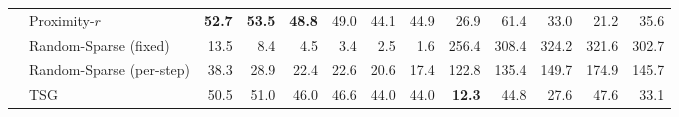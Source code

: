 \begin{table}[!ht]
\begin{tabular}{llrrrrrrrrrrr}
 & Proximity-$r$ & \textbf{52.7} & \textbf{53.5} & \textbf{48.8} & 49.0 & 44.1 & 44.9 & 26.9 & 61.4 & 33.0 & 21.2 & 35.6 \\
 & Random-Sparse (fixed) & 13.5 & 8.4 & 4.5 & 3.4 & 2.5 & 1.6 & 256.4 & 308.4 & 324.2 & 321.6 & 302.7 \\
 & Random-Sparse (per-step) & 38.3 & 28.9 & 22.4 & 22.6 & 20.6 & 17.4 & 122.8 & 135.4 & 149.7 & 174.9 & 145.7 \\
 & TSG & 50.5 & 51.0 & 46.0 & 46.6 & 44.0 & 44.0 & \textbf{12.3} & 44.8 & 27.6 & 47.6 & 33.1 \\
\hline
\end{tabular}
\end{table}
